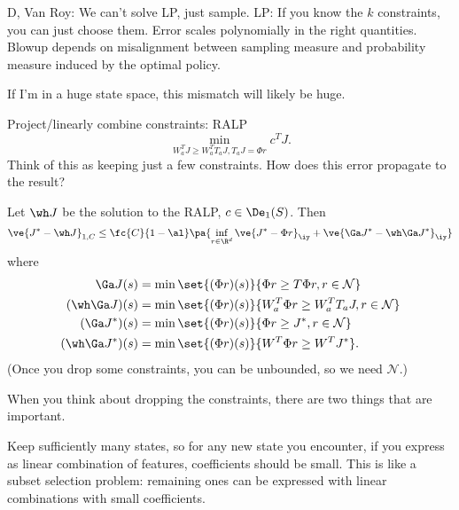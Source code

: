 

D, Van Roy: We can't solve LP, just sample.
LP: If you know the $k$ constraints, you can just choose them. Error scales polynomially in the right quantities. Blowup depends on misalignment between sampling measure and probability measure induced by the optimal policy.

If I'm in a huge state space, this mismatch will likely be huge. 

Project/linearly combine constraints: RALP
$$
\min_{W_a^T J \ge W_a^T T_aJ, T_a J = \Phi r} c^TJ.
$$
Think of this as keeping just a few constraints. How does this error propagate to the result? 
\begin{thm}
Let $\wh J$ be the solution to the RALP, $c\in \De_1(S)$.
Then
$$
\ve{J^* - \wh J}_{1,C} \le \fc{C}{1-\al} \pa{
\inf_{r\in \R^d} \ve{J^*-\Phi r}_\iy + 
\ve{\Ga J^* - \wh \Ga J^*}_{\iy}}
$$
where 
\begin{align}
\Ga J(s) &= \min\set{(\Phi r)(s)}{\Phi r \ge T\Phi r, r\in \mathcal N}\\
(\wh \Ga J)(s) &= \min \set{(\Phi r)(s)}{W_a^T \Phi r \ge W_a^T T_aJ, r\in \mathcal N}\\
(\Ga J^*)(s) &= \min\set{(\Phi r)(s)}{\Phi r\ge J^*, r\in \mathcal N}\\
(\wh \Ga J^*)(s) &= \min\set{(\Phi r)(s)}{W^T \Phi r \ge W^T J^*}.
\end{align}
(Once you drop some constraints, you can be unbounded, so we need $\mathcal N$.)
\end{thm}
When you think about dropping the constraints, there are two things that are important. 

Keep sufficiently many states, so for any new state you encounter, if you express as linear combination of features, coefficients should be small. 
This is like a subset selection problem: remaining ones can be expressed with linear combinations with small coefficients.

